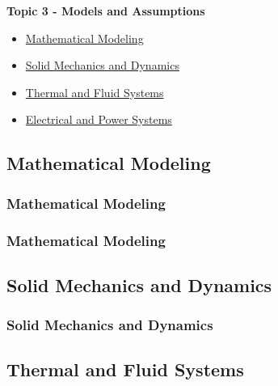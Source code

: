 \documentclass[fleqn]{beamer} %
\newcommand{\sectionIIItitle}{Models and Assumptions}
\newcommand{\sectionIIIsubsectionItitle}{Mathematical Modeling}
\newcommand{\sectionIIIsubsectionIItitle}{Solid Mechanics and Dynamics}
\newcommand{\sectionIIIsubsectionIIItitle}{Thermal and Fluid Systems}
\newcommand{\sectionIIIsubsectionIVtitle}{Electrical and Power Systems}
\newcommand{\btVFill}{\vskip0pt plus 1filll}
\begin{document}
		\begin{frame}
			\large \textbf{Topic 3 - \sectionIIItitle} \vspace{3mm}\\

			\begin{itemize}
				\item \hyperlink{sectionIIIsubsectionI}{\sectionIIIsubsectionItitle} \vspc %
				\item \hyperlink{sectionIIIsubsectionII}{\sectionIIIsubsectionIItitle} \vspc %
				\item \hyperlink{sectionIIIsubsectionIII}{\sectionIIIsubsectionIIItitle} \vspc %
				\item \hyperlink{sectionIIIsubsectionIV}{\sectionIIIsubsectionIVtitle} \vspc %
			\end{itemize}

		\end{frame}

		\subsection{\sectionIIIsubsectionItitle}\label{sectionIIIsubsectionI}

			\begin{frame}
				\frametitle{\sectionIIIsubsectionItitle}
		

			\end{frame}

			\begin{frame}
				\frametitle{\sectionIIIsubsectionItitle}
		

			\end{frame}

		\subsection{\sectionIIIsubsectionIItitle}\label{sectionIIIsubsectionII}	

			\begin{frame}
				\frametitle{\sectionIIIsubsectionIItitle}
		

			\end{frame}

		\subsection{\sectionIIIsubsectionIIItitle}\label{sectionIIIsubsectionIII}
\end{document}
